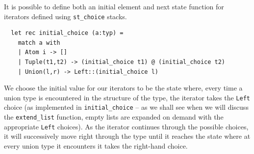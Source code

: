 \documentclass[a4paper,english]{lipics-v2018}
\begin{document}
It is possible to define both an initial element and next state function for
iterators defined using \verb|st_choice| stacks.





\begin{small}
\begin{verbatim}
  let rec initial_choice (a:typ) = 
    match a with
    | Atom i -> []
    | Tuple(t1,t2) -> (initial_choice t1) @ (initial_choice t2)
    | Union(l,r) -> Left::(initial_choice l)
\end{verbatim}
\end{small}
We choose the initial value for our iterators to be the state where, every
time a union type is encountered in the structure of the type, the iterator
takes the \verb+Left+ choice (as implemented in \verb|initial_choice|
-- as we shall see when we will discuss the \verb+extend_list+
function, empty lists are expanded on demand with the appropriate
\verb+Left+ choices).  As the
iterator continues through the possible choices, it will successively move
right through the type until it reaches the state where at every union type
it encounters it takes the right-hand choice.
\end{document}
